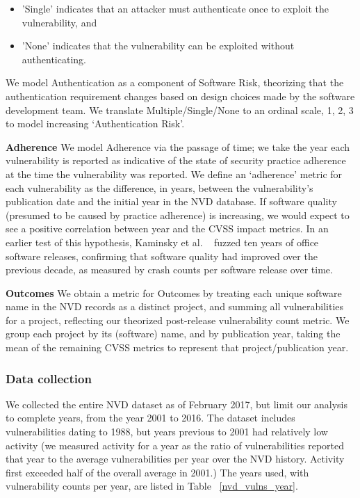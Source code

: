 \begin{itemize}
\begin{itemize}
		\item 'Single' indicates that an attacker must authenticate once to exploit the vulnerability, and 
		\item 'None' indicates that the vulnerability can be exploited without authenticating.  
	\end{itemize}
	We model Authentication as a component of Software Risk, theorizing that the authentication requirement changes based on design choices made by the software development team. We translate Multiple/Single/None to an ordinal scale, 1, 2, 3 to model increasing `Authentication Risk'.
\end{itemize}
  
\textbf{Adherence}
We model Adherence via the passage of time; we take the year each vulnerability is reported as indicative of the state of security practice adherence at the time the vulnerability was reported. We define an `adherence' metric for each vulnerability as the difference, in years, between the vulnerability's publication date and the initial year in the NVD database. If software quality (presumed to be caused by practice adherence) is increasing, we would expect to see a positive correlation between year and the CVSS impact metrics.  In an earlier test of this hypothesis, Kaminsky et al. ~\cite{kaminsky2011showing} fuzzed ten years of office software releases, confirming that software quality had improved over the previous decade, as measured by crash counts per software release over time. 
    
\textbf{Outcomes}
We obtain a metric for Outcomes by treating each unique software name in the NVD records as a distinct project, and summing all vulnerabilities for a project, reflecting our theorized post-release vulnerability count metric. We group each project by its (software) name, and by publication year, taking the mean of the remaining CVSS metrics to represent that project/publication year. 


	
\subsubsection{Data collection}
We collected the entire NVD dataset as of February 2017, but limit our analysis to complete years, from the year 2001 to 2016. The dataset includes vulnerabilities dating to 1988, but years previous to 2001 had relatively low activity (we measured activity for a year as the ratio of vulnerabilities reported that year to the average vulnerabilities per year over the NVD history. Activity first exceeded half of the overall average in 2001.) The years used, with vulnerability counts per year, are listed in Table ~\ref{nvd_vulns_year}.

